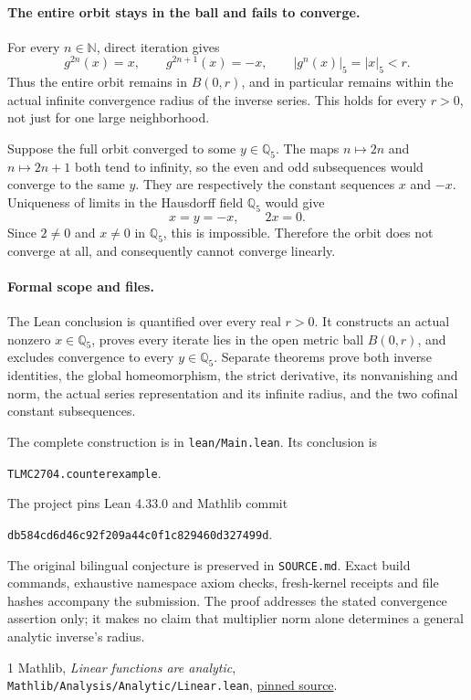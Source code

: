 \documentclass[11pt,a4paper]{article}
\newcommand{\Q}{\mathbb Q}
\newcommand{\N}{\mathbb N}
\begin{document}
\paragraph{The entire orbit stays in the ball and fails to converge.}
For every $n\in\N$, direct iteration gives
\[
g^{2n}(x)=x,\qquad g^{2n+1}(x)=-x,
\qquad |g^n(x)|_5=|x|_5<r.
\]
Thus the entire orbit remains in $B(0,r)$, and in particular remains within
the actual infinite convergence radius of the inverse series. This holds
for every $r>0$, not just for one large neighborhood.

Suppose the full orbit converged to some $y\in\Q_5$. The maps
$n\mapsto2n$ and $n\mapsto2n+1$ both tend to infinity, so the even and odd
subsequences would converge to the same $y$. They are respectively the
constant sequences $x$ and $-x$. Uniqueness of limits in the Hausdorff field
$\Q_5$ would give
\[
x=y=-x,
\qquad 2x=0.
\]
Since $2\ne0$ and $x\ne0$ in $\Q_5$, this is impossible. Therefore the orbit
does not converge at all, and consequently cannot converge linearly.

\paragraph{Formal scope and files.}
The Lean conclusion is quantified over every real $r>0$. It constructs
an actual nonzero $x\in\Q_5$, proves every iterate lies in the open metric
ball $B(0,r)$, and excludes convergence to every $y\in\Q_5$. Separate
theorems prove both inverse identities, the global homeomorphism, the strict
derivative, its nonvanishing and norm, the actual series representation and
its infinite radius, and the two cofinal constant subsequences.

The complete construction is in \texttt{lean/Main.lean}. Its conclusion is
\begin{center}
\texttt{TLMC2704.counterexample}.
\end{center}
The project pins Lean 4.33.0 and Mathlib commit
\begin{center}
\small\texttt{db584cd6d46c92f209a44c0f1c829460d327499d}.
\end{center}
The original bilingual conjecture is preserved in \texttt{SOURCE.md}.
Exact build commands, exhaustive namespace axiom checks, fresh-kernel
receipts and file hashes accompany the submission. The proof addresses
the stated convergence assertion only; it makes no claim that multiplier
norm alone determines a general analytic inverse's radius.

\begin{thebibliography}{1}
Mathlib, \emph{Linear functions are analytic},
\texttt{Mathlib/Analysis/Analytic/Linear.lean},
\href{https://github.com/leanprover-community/mathlib4/blob/db584cd6d46c92f209a44c0f1c829460d327499d/Mathlib/Analysis/Analytic/Linear.lean}{pinned source}.
\end{thebibliography}
\end{document}
